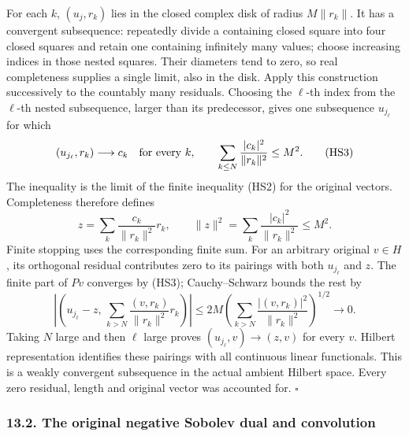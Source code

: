 \documentclass[
  11pt,
]{article}
\begin{document}
For each \(k\), \((u_j,r_k)\) lies in the closed complex disk of radius
\(M\|r_k\|\). It has a convergent subsequence: repeatedly divide a
containing closed square into four closed squares and retain one
containing infinitely many values; choose increasing indices in those
nested squares. Their diameters tend to zero, so real completeness
supplies a single limit, also in the disk. Apply this construction
successively to the countably many residuals. Choosing the \(\ell\)-th
index from the \(\ell\)-th nested subsequence, larger than its
predecessor, gives one subsequence \(u_{j_\ell}\) for which \[
 (u_{j_\ell},r_k)\longrightarrow c_k\quad\hbox{for every }k,
 \qquad
 \sum_{k\leq N}\frac{|c_k|^2}{\|r_k\|^2}\leq M^2.                \tag{HS3}
\] The inequality is the limit of the finite inequality (HS2) for the
original vectors. Completeness therefore defines \[
 z=\sum_k\frac{c_k}{\|r_k\|^2}r_k,\qquad
 \|z\|^2=\sum_k\frac{|c_k|^2}{\|r_k\|^2}\leq M^2.                \tag{HS4}
\] Finite stopping uses the corresponding finite sum. For an arbitrary
original \(v\in H\), its orthogonal residual contributes zero to its
pairings with both \(u_{j_\ell}\) and \(z\). The finite part of \(Pv\)
converges by (HS3); Cauchy--Schwarz bounds the rest by \[
 \left|\left(u_{j_\ell}-z,\,
          \sum_{k>N}\frac{(v,r_k)}{\|r_k\|^2}r_k\right)\right|
 \leq 2M
       \left(\sum_{k>N}\frac{|(v,r_k)|^2}{\|r_k\|^2}\right)^{1/2}
       \longrightarrow0.                                     \tag{HS5}
\] Taking \(N\) large and then \(\ell\) large proves
\((u_{j_\ell},v)\to(z,v)\) for every \(v\). Hilbert representation
identifies these pairings with all continuous linear functionals. This
is a weakly convergent subsequence in the actual ambient Hilbert space.
Every zero residual, length and original vector was accounted for.
\(\square\)

\subsubsection{13.2. The original negative Sobolev dual and
convolution}\label{the-original-negative-sobolev-dual-and-convolution}
\end{document}
